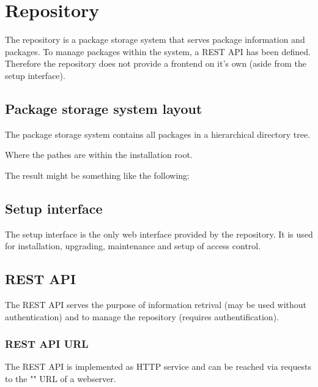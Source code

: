 \section[sec:repository]{Repository}
The repository is a package storage system that serves package information and packages.
To manage packages within the system, a REST API has been defined. Therefore the repository does not provide a frontend on it's own (aside from the setup interface).

\subsection[sec:repository package storage system]{Package storage system layout}
The package storage system contains all packages in a hierarchical directory tree.

Where the pathes are within the installation root.

The result might be something like the following:

\subsection[sec:repository setup interface]{Setup interface}

The setup interface is the only web interface provided by the repository. It is used for installation, upgrading, maintenance and setup of access control.

\subsection[sec:repository rest api]{REST API}


The REST API serves the purpose of information retrival (may be used without authentication) and to manage the repository (requires authentification).

\subsubsection[sec:repository rest api url]{REST API URL}
The REST API is implemented as HTTP service and can be reached via requests to the "" URL of a webserver.


